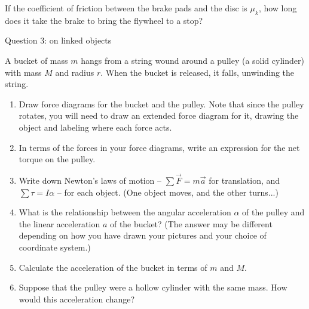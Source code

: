 \documentclass[12pt]{article}
\begin{document}
If the coefficient of friction between the brake pads and the disc is $\mu_k$, how long does it take the
brake to bring the flywheel to a stop?

\newpage
\centerline{\large Question 3: on linked objects}

A bucket of mass $m$ hangs from a string wound around a pulley
(a solid cylinder) with mass $M$ and radius $r$. When the bucket is
released, it falls, unwinding the string.

\begin{enumerate}

\item Draw force diagrams for the bucket and the pulley. Note that since the pulley rotates, you will need
to draw an extended force diagram for it, drawing the object and labeling where each force acts.

\vspace{3in}

\item In terms of the forces in your force diagrams, write an expression for the net torque on the pulley.

\vspace{1in}

\item Write down Newton's laws of motion -- $\sum \vec F = m \vec a$ for translation, and $\sum \tau = I \alpha$
-- for each object. (One object moves, and the other turns...)

\vspace{2in}


\newpage

\item What is the relationship between the angular acceleration $\alpha$ of the pulley and the linear acceleration
$a$ of the bucket? (The answer may be different depending on how you have drawn your pictures and your choice of
coordinate system.)

\vspace{1in}

\item Calculate the acceleration of the bucket in terms of $m$ and $M$.

\vspace{3in}

\item Suppose that the pulley were a hollow cylinder with the same mass. How would this acceleration change?

\end{enumerate}
\end{document}
